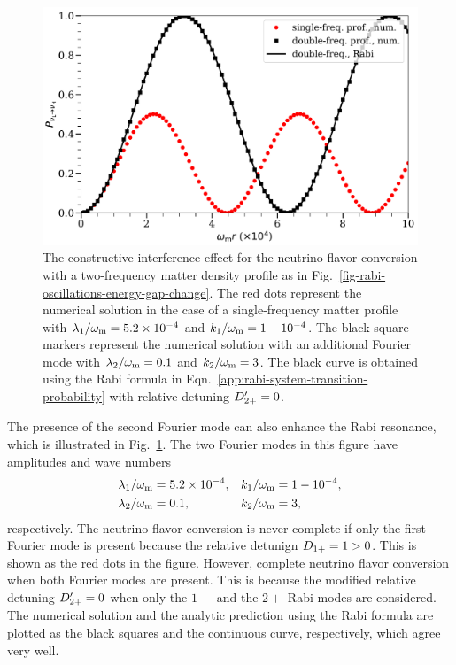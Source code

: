 \begin{figure}[!htbp]
    \centering
    \includegraphics[width=\textwidth]{chapters/assets/matter/interference-enhance-slide-with-legend}
    \caption{The constructive interference effect for the neutrino flavor conversion with a two-frequency matter density profile as in Fig.~\ref{fig-rabi-oscillations-energy-gap-change}. The red dots represent the numerical solution in the case of a single-frequency matter profile with $\lambda_1 /\omega_\mathrm m = 5.2\times 10^{-4}$ and $k_1/\omega_\mathrm m = 1- 10^{-4}$. The black square markers represent the numerical solution with an additional Fourier mode with $\lambda_2/\omega_\mathrm m=0.1$ and $k_2/\omega_\mathrm m=3$. The black curve is obtained using the Rabi formula in Eqn.~\ref{app:rabi-system-transition-probability} with relative detuning $D'_{2+}=0$.}
    \label{chap:matter-sec:constructive-fig:two-frequencies-constructive}
\end{figure}

The presence of the second Fourier mode can also enhance the Rabi resonance, which is illustrated in Fig.~\ref{chap:matter-sec:constructive-fig:two-frequencies-constructive}. The two Fourier modes in this figure have amplitudes and wave numbers
\begin{align*}
    \lambda_1/\omega_\mathrm m & =5.2\times 10^{-4}, & k_1/\omega_\mathrm m &= 1- 10^{-4},\\
    \lambda_2/\omega_\mathrm m & =0.1, & k_2/\omega_\mathrm m &= 3,
\end{align*}
respectively. The neutrino flavor conversion is never complete if only the first Fourier mode is present because the relative detunign $D_{1+}=1 > 0$. This is shown as the red dots in the figure. However, complete neutrino flavor conversion when both Fourier modes are present. This is because the modified relative detuning $D'_{2+} = 0$ when only the $1+$ and the $2+$ Rabi modes are considered. The numerical solution and the analytic prediction using the Rabi formula are plotted as the black squares and the continuous curve, respectively, which agree very well.


